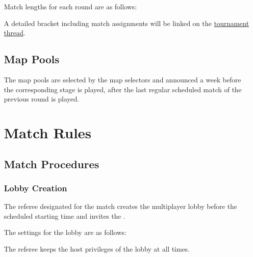 \begin{samepage}
Match lengths for each round are as follows:
\matchlengths
\end{samepage}

\custombracketpost

A detailed bracket including match assignments will be linked on the \href{\thread}{tournament thread}.

\subsection{Map Pools}


\custommappool

The map pools are selected by the map selectors and announced a week before the corresponding stage is played, after the last regular scheduled match of the previous round is played.

\section{Match Rules}

\subsection{Match Procedures}

\subsubsection{Lobby Creation}
The referee designated for the match creates the multiplayer lobby \lobbyopen{} before the scheduled starting time and invites the .

\begin{samepage}
The settings for the lobby are as follows:


\end{samepage}

The referee keeps the host privileges of the lobby at all times.

